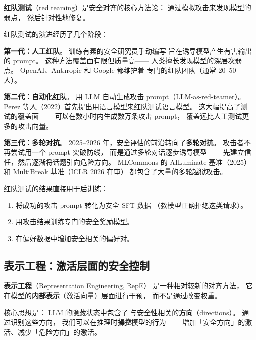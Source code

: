 \textbf{红队测试}（red teaming）是安全对齐的核心方法论：
通过模拟攻击来发现模型的弱点，
然后针对性地修复。


红队测试的演进经历了几个阶段：

\textbf{第一代：人工红队}。
训练有素的安全研究员手动编写
旨在诱导模型产生有害输出的 prompt。
这种方法覆盖面有限但质量高——
人类擅长发现模型的深层次弱点。
OpenAI、Anthropic 和 Google 都维护着
专门的红队团队（通常 20--50 人）。

\textbf{第二代：自动化红队}。
用 LLM 自动生成攻击 prompt（LLM-as-red-teamer）。
Perez 等人（2022）首先提出用语言模型来红队测试语言模型。
这大幅提高了测试的覆盖面——
可以在数小时内生成数万条攻击 prompt，
覆盖远比人工测试更多的攻击向量。

\textbf{第三代：多轮对抗}。
2025--2026 年，安全评估的前沿转向了\textbf{多轮对抗}。
攻击者不再尝试用一个 prompt 突破防线，
而是通过多轮对话逐步诱导模型——
先建立信任，然后逐渐将话题引向危险方向。
MLCommons 的 AILuminate 基准（2025）
和 MultiBreak 基准（ICLR 2026 在审）
都包含了大量的多轮越狱攻击。

红队测试的结果直接用于后训练：
\begin{enumerate}[noitemsep]
  \item 将成功的攻击 prompt 转化为安全 SFT 数据
       （教模型正确拒绝这类请求）。
  \item 用攻击结果训练专门的安全奖励模型。
  \item 在偏好数据中增加安全相关的偏好对。
\end{enumerate}

\subsection{表示工程：激活层面的安全控制}


\textbf{表示工程}（Representation Engineering, RepE）
是一种相对较新的对齐方法，
它在模型的\textbf{内部表示}（激活向量）层面进行干预，
而不是通过改变权重。

核心思想是：
LLM 的隐藏状态中包含了
与安全性相关的\textbf{方向}（directions）。
通过识别这些方向，
我们可以在推理时\textbf{操控}模型的行为——
增加「安全方向」的激活、减少「危险方向」的激活。

